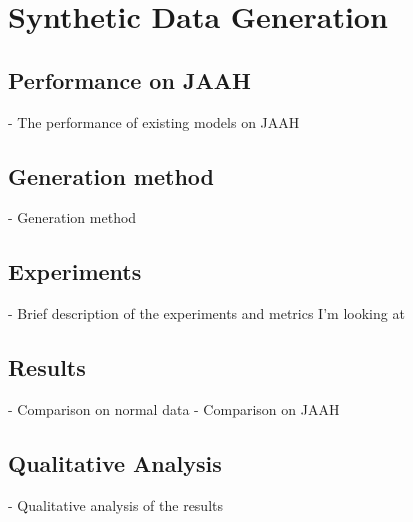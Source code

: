 \chapter{Synthetic Data Generation}
\label{chap:synthetic_data}


\section{Performance on JAAH}
- The performance of existing models on JAAH

\section{Generation method}
- Generation method

\section{Experiments}
- Brief description of the experiments and metrics I'm looking at

\section{Results}
- Comparison on normal data
- Comparison on JAAH

\section{Qualitative Analysis}
- Qualitative analysis of the results